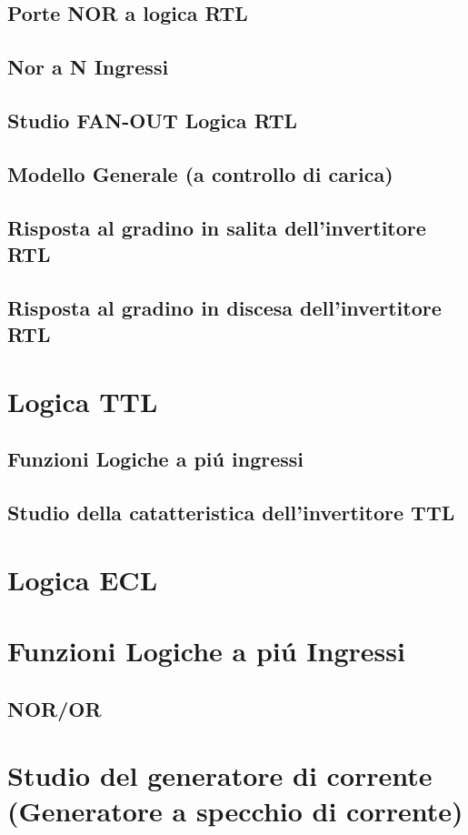 \documentclass{article}
\begin{document}
\subsection{Porte NOR a logica RTL}
\subsection{Nor a N Ingressi}
\subsection{Studio FAN-OUT Logica RTL}
\subsection{Modello Generale (a controllo di carica)}
\subsection{Risposta al gradino in salita dell'invertitore RTL}
\subsection{Risposta al gradino in discesa dell'invertitore RTL}
\section{Logica TTL}
\subsection{Funzioni Logiche a pi\'u ingressi}
\subsection{Studio della catatteristica dell'invertitore TTL}
\section{Logica ECL}
\section{Funzioni Logiche a pi\'u Ingressi}
\subsection{NOR/OR}
\section{Studio del generatore di corrente (Generatore a specchio di corrente)}
\end{document}
